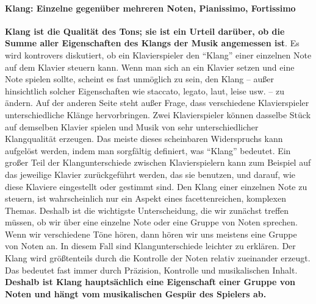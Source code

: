 \paragraph{Klang: Einzelne gegenüber mehreren Noten, Pianissimo, Fortissimo}
\label{c1iii1a2}

\textbf{Klang ist die Qualität des Tons; sie ist ein Urteil darüber, ob die Summe aller Eigenschaften des Klangs der Musik angemessen ist}.
Es wird kontrovers diskutiert, ob ein Klavierspieler den \enquote{Klang} einer einzelnen Note auf dem Klavier steuern kann.
Wenn man sich an ein Klavier setzen und eine Note spielen sollte, scheint es fast unmöglich zu sein, den Klang -- außer hinsichtlich solcher Eigenschaften wie staccato, legato, laut, leise usw. -- zu ändern.
Auf der anderen Seite steht außer Frage, dass verschiedene Klavierspieler unterschiedliche Klänge hervorbringen.
Zwei Klavierspieler können dasselbe Stück auf demselben Klavier spielen und Musik von sehr unterschiedlicher Klangqualität erzeugen.
Das meiste dieses scheinbaren Widerspruchs kann aufgelöst werden, indem man sorgfältig definiert, was \enquote{Klang} bedeutet.
Ein großer Teil der Klangunterschiede zwischen Klavierspielern kann zum Beispiel auf das jeweilige Klavier zurückgeführt werden, das sie benutzen, und darauf, wie diese Klaviere eingestellt oder gestimmt sind.
Den Klang einer einzelnen Note zu steuern, ist wahrscheinlich nur ein Aspekt eines facettenreichen, komplexen Themas.
Deshalb ist die wichtigste Unterscheidung, die wir zunächst treffen müssen, ob wir über eine einzelne Note oder eine Gruppe von Noten sprechen.
Wenn wir verschiedene Töne hören, dann hören wir uns meistens eine Gruppe von Noten an.
In diesem Fall sind Klangunterschiede leichter zu erklären.
Der Klang wird größtenteils durch die Kontrolle der Noten relativ zueinander erzeugt.
Das bedeutet fast immer durch Präzision, Kontrolle und musikalischen Inhalt.
\textbf{Deshalb ist Klang hauptsächlich eine Eigenschaft einer Gruppe von Noten und hängt vom musikalischen Gespür des Spielers ab.}


